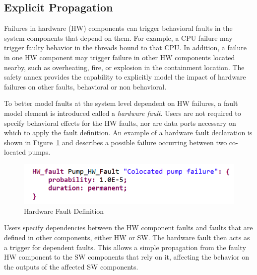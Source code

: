 \subsection{Explicit Propagation} 
Failures in hardware (HW) components can trigger behavioral faults in the system components that depend on them. For example, a CPU failure may trigger faulty behavior in the threads bound to that CPU. In addition, a failure in one HW component may trigger failure in other HW components located nearby, such as overheating, fire, or explosion
in the containment location. The safety annex provides the capability to explicitly model the impact of hardware failures on other faults, behavioral or non behavioral. 

To better model faults at the system level dependent on HW failures, a fault model element is introduced called a \textit{hardware fault}. Users are not required to specify behavioral effects for the HW faults, nor are data ports necessary on which to apply the fault definition. An example of a hardware fault declaration is shown in Figure~\ref{fig:hwFault} and describes a possible failure occurring between two co-located pumps. 
\begin{figure}[h!]
	\begin{center}
	\includegraphics[width=.6\textwidth]{images/hw_fault2.png}
	\end{center}
	\vspace{-0.1in}
	\caption{Hardware Fault Definition}
	\label{fig:hwFault}
\end{figure}


Users specify dependencies between the HW component faults and faults that are defined in other components, either HW or SW. The hardware fault then acts as a trigger for dependent faults. This allows a simple propagation from the faulty HW component to the SW components that rely on it, affecting the behavior on the outputs of the affected SW components.

